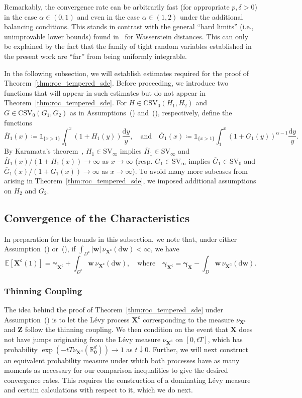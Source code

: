 \documentclass[en,oneside,bbfont,article]{amsart}
\theoremstyle{remark}
\theoremstyle{definition}
\theoremstyle{definition}
\newcommand\R{\mathbb{R}}
\newcommand\E{\mathds{E}}
\newcommand\1{\mathds{1}}
\newcommand\SV{\mathrm{SV}}
\newcommand\CSV{\mathrm{CSV}}
\newcommand\da{\downarrow}
\newcommand\co{\mathsf{c}}
\newcommand{\D}{\mathrm{d}}
\newcommand{\ov}[1]{\overline{#1}}
\begin{document}
Remarkably, the convergence rate can be arbitrarily fast (for appropriate $p,\delta>0$) in the case $\alpha\in(0,1)$ and even in the case $\alpha\in(1,2)$ under the additional balancing conditions. This stands in contrast with the general ``hard limits'' (i.e., unimprovable lower bounds) found in~\cite{WassersteinPaper} for Wasserstein distances. This can only be explained by the fact that the family of tight random variables established in the present work are ``far'' from being uniformly integrable. 


In the following subsection, we will establish estimates required for the proof of Theorem~\ref{thm:roc_tempered_sde}. Before proceeding, we introduce two functions that will appear in such estimates but do not appear in Theorem~\ref{thm:roc_tempered_sde}. For $H\in\CSV_0(H_1,H_2)$ and $G\in\CSV_0(G_1,G_2)$ as in Assumptions~() and~(), respectively, define the functions
\[
\ov{H}_1(x)
\coloneqq\1_{\{x>1\}}\int_1^x (1+H_1(y))\frac{\D y}{y},
\quad\text{and}\quad
\ov{G}_1(x)
\coloneqq\1_{\{x>1\}}\int_1^x (1+G_1(y))^{\alpha-1} \frac{\D y}{y}.
\]
By Karamata's theorem~\cite[Thm~1.5.9]{MR1015093}, $H_1\in\SV_\infty$ implies $\ov{H}_1\in\SV_\infty$ and $\ov{H}_1(x)/(1+H_1(x))\to\infty$ as $x\to\infty$ (resp. $G_1\in\SV_\infty$ implies $\ov{G}_1\in\SV_0$ and $\ov{G}_1(x)/(1+G_1(x))\to\infty$ as $x\to\infty$). To avoid many more subcases from arising in Theorem~\ref{thm:roc_tempered_sde}, we imposed additional assumptions on $H_2$ and $G_2$.

\subsection{Convergence of the Characteristics}
\label{sec:conv_characteristics}

In preparation for the bounds in this subsection, we note that, under either Assumption~() or~(), if $\int_{D^\co}|\bm{w}|\,\nu_{\bm{X}^\co}(\D\bm{w})<\infty$, we have
\[
\E[\bm{X}^\co(1)]
=\bm{\gamma}_{\bm{X}^\co}
+\int_{D^\co}
\bm{w}\,\nu_{\bm{X}^\co}(\D\bm{w}),
\quad\text{where}\quad
\bm{\gamma}_{\bm{X}^\co}
=\bm{\gamma}_{\bm{X}}
-\int_{D}\bm{w}\,\nu_{\bm{X}^\D}(\D\bm{w}).
\]

\subsubsection{Thinning Coupling}
\label{sec:thinning_technic_bound}

The idea behind the proof of Theorem~\ref{thm:roc_tempered_sde} under Assumption~() is to let the L\'evy process $\bm{X}^\co$ corresponding to the measure $\nu_{\bm{X}^\co}$ and $\bm{Z}$ follow the thinning coupling. We then condition on the event that $\bm{X}$ does not have jumps originating from the L\'evy measure $\nu_{\bm{X}^\D}$ on $[0,tT]$, which has probability $\exp(-tT\nu_{\bm{X}^\D}(\R^d_{\bm 0}))\to 1$ as $t\da 0$. Further, we will next construct an equivalent probability measure under which both processes have as many moments as necessary for our comparison inequalities to give the desired convergence rates. This requires the construction of a dominating L\'evy measure and certain calculations with respect to it, which we do next.
\end{document}
